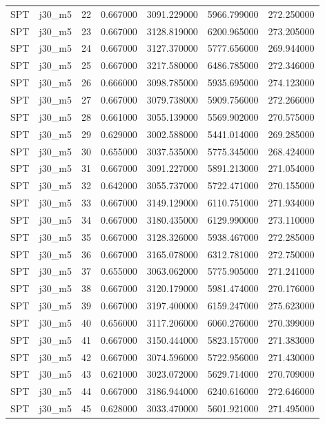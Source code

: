 \begin{tabular}{llrrrrr}
SPT & j30_m5 & 22 & 0.667000 & 3091.229000 & 5966.799000 & 272.250000 \\
SPT & j30_m5 & 23 & 0.667000 & 3128.819000 & 6200.965000 & 273.205000 \\
SPT & j30_m5 & 24 & 0.667000 & 3127.370000 & 5777.656000 & 269.944000 \\
SPT & j30_m5 & 25 & 0.667000 & 3217.580000 & 6486.785000 & 272.346000 \\
SPT & j30_m5 & 26 & 0.666000 & 3098.785000 & 5935.695000 & 274.123000 \\
SPT & j30_m5 & 27 & 0.667000 & 3079.738000 & 5909.756000 & 272.266000 \\
SPT & j30_m5 & 28 & 0.661000 & 3055.139000 & 5569.902000 & 270.575000 \\
SPT & j30_m5 & 29 & 0.629000 & 3002.588000 & 5441.014000 & 269.285000 \\
SPT & j30_m5 & 30 & 0.655000 & 3037.535000 & 5775.345000 & 268.424000 \\
SPT & j30_m5 & 31 & 0.667000 & 3091.227000 & 5891.213000 & 271.054000 \\
SPT & j30_m5 & 32 & 0.642000 & 3055.737000 & 5722.471000 & 270.155000 \\
SPT & j30_m5 & 33 & 0.667000 & 3149.129000 & 6110.751000 & 271.934000 \\
SPT & j30_m5 & 34 & 0.667000 & 3180.435000 & 6129.990000 & 273.110000 \\
SPT & j30_m5 & 35 & 0.667000 & 3128.326000 & 5938.467000 & 272.285000 \\
SPT & j30_m5 & 36 & 0.667000 & 3165.078000 & 6312.781000 & 272.750000 \\
SPT & j30_m5 & 37 & 0.655000 & 3063.062000 & 5775.905000 & 271.241000 \\
SPT & j30_m5 & 38 & 0.667000 & 3120.179000 & 5981.474000 & 270.176000 \\
SPT & j30_m5 & 39 & 0.667000 & 3197.400000 & 6159.247000 & 275.623000 \\
SPT & j30_m5 & 40 & 0.656000 & 3117.206000 & 6060.276000 & 270.399000 \\
SPT & j30_m5 & 41 & 0.667000 & 3150.444000 & 5823.157000 & 271.383000 \\
SPT & j30_m5 & 42 & 0.667000 & 3074.596000 & 5722.956000 & 271.430000 \\
SPT & j30_m5 & 43 & 0.621000 & 3023.072000 & 5629.714000 & 270.709000 \\
SPT & j30_m5 & 44 & 0.667000 & 3186.944000 & 6240.616000 & 272.646000 \\
SPT & j30_m5 & 45 & 0.628000 & 3033.470000 & 5601.921000 & 271.495000 \\

\end{tabular}
